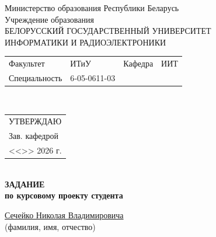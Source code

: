 {
  \thispagestyle{empty}
  \setlength{\parindent}{0em}

  \newcommand{\lineunderscore}{\uline{\hspace*{\fill}}}

  \begin{center}
    Министерство образования Республики Беларусь\\
    Учреждение образования\\
    БЕЛОРУССКИЙ ГОСУДАРСТВЕННЫЙ УНИВЕРСИТЕТ \\
    ИНФОРМАТИКИ И РАДИОЭЛЕКТРОНИКИ\\[1em]
  

  \begin{minipage}{\textwidth}
    \begin{flushleft}
      \begin{tabular}{ p{}p{}p{}p{} @{} }
        Факультет & ИТиУ & Кафедра & ИИТ \\
        Специальность   & 6‑05-0611-03
      \end{tabular}
    \end{flushleft}
  \end{minipage}\\[1em]

  \begin{minipage}{\textwidth}
    \begin{flushright}
      \begin{tabular}{p{}}
        УТВЕРЖДАЮ \\[0.5em]
        \underline{\hspace*{6em}} Зав. кафедрой \\
        
        <<\underline{\hspace*{4ex}}>> \underline{\hspace*{7em}} 2026 г.
      \end{tabular}
    \end{flushright}
  \end{minipage}\\[1em]

  \textbf{ЗАДАНИЕ} \\
  \textbf{по курсовому проекту студента}

  \lineunderscore\uline{Сечейко Николая Владимировича}\lineunderscore \\
  {\small (фамилия, имя, отчество) }


\end{center}}
